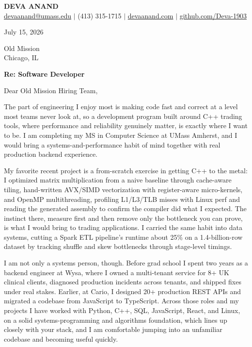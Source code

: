 \documentclass[letterpaper,11pt]{article}
\begin{document}
\begin{center}
    {\fontsize{18}{20}\selectfont\bfseries DEVA ANAND}\\ \vspace{3pt}
    {\small
    \href{mailto:devaanand@umass.edu}{devaanand@umass.edu}
    \enspace$\vert$\enspace
    (413) 315-1715
    \enspace$\vert$\enspace
    \href{https://devaanand.com}{devaanand.com}
    \enspace$\vert$\enspace
    \href{https://github.com/Deva-1903}{github.com/Deva-1903}}
\end{center}
\vspace{6pt}

\noindent July 15, 2026

\vspace{2pt}

\noindent Old Mission\\
Chicago, IL

\vspace{2pt}

\noindent \textbf{Re: Software Developer}

\vspace{4pt}

\noindent Dear Old Mission Hiring Team,

The part of engineering I enjoy most is making code fast and correct at a level most teams never look at, so a development program built around C++ trading tools, where performance and reliability genuinely matter, is exactly where I want to be. I am completing my MS in Computer Science at UMass Amherst, and I would bring a systems-and-performance habit of mind together with real production backend experience.

My favorite recent project is a from-scratch exercise in getting C++ to the metal: I optimized matrix multiplication from a naive baseline through cache-aware tiling, hand-written AVX/SIMD vectorization with register-aware micro-kernels, and OpenMP multithreading, profiling L1/L3/TLB misses with Linux perf and reading the generated assembly to confirm the compiler did what I expected. The instinct there, measure first and then remove only the bottleneck you can prove, is what I would bring to trading applications. I carried the same habit into data systems, cutting a Spark ETL pipeline's runtime about 25\% on a 1.4-billion-row dataset by tracking shuffle and skew bottlenecks through stage-level timings.

I am not only a systems person, though. Before grad school I spent two years as a backend engineer at Wysa, where I owned a multi-tenant service for 8+ UK clinical clients, diagnosed production incidents across tenants, and shipped fixes under real stakes. Earlier, at Cario, I designed 20+ production REST APIs and migrated a codebase from JavaScript to TypeScript. Across those roles and my projects I have worked with Python, C++, SQL, JavaScript, React, and Linux, on a solid systems-programming and algorithms foundation, which lines up closely with your stack, and I am comfortable jumping into an unfamiliar codebase and becoming useful quickly.
\end{document}
